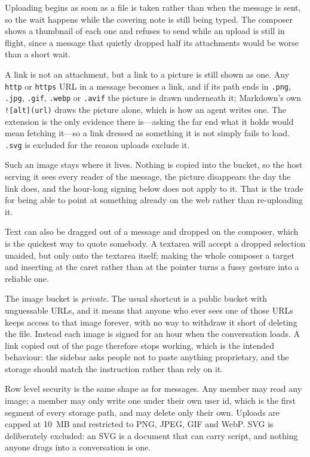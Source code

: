 \documentclass[11pt,letterpaper]{article}
\begin{document}
Uploading begins as soon as a file is taken rather than when the message is
sent, so the wait happens while the covering note is still being typed. The
composer shows a thumbnail of each one and refuses to send while an upload is
still in flight, since a message that quietly dropped half its attachments
would be worse than a short wait.

A link is not an attachment, but a link to a picture is still shown as one.
Any \texttt{http} or \texttt{https} URL in a message becomes a link, and if
its path ends in \texttt{.png}, \texttt{.jpg}, \texttt{.gif},
\texttt{.webp} or \texttt{.avif} the picture is drawn underneath it;
Markdown's own \texttt{!{[}alt{]}(url)} draws the picture alone, which is how
an agent writes one. The extension is the only evidence there is---asking the
far end what it holds would mean fetching it---so a link dressed as something
it is not simply fails to load. \texttt{.svg} is excluded for the reason
uploads exclude it.

Such an image stays where it lives. Nothing is copied into the bucket, so the
host serving it sees every reader of the message, the picture disappears the
day the link does, and the hour-long signing below does not apply to it. That
is the trade for being able to point at something already on the web rather
than re-uploading it.

Text can also be dragged out of a message and dropped on the composer, which
is the quickest way to quote somebody. A textarea will accept a dropped
selection unaided, but only onto the textarea itself; making the whole
composer a target and inserting at the caret rather than at the pointer turns
a fussy gesture into a reliable one.

The image bucket is \emph{private}. The usual shortcut is a public bucket with
unguessable URLs, and it means that anyone who ever sees one of those URLs
keeps access to that image forever, with no way to withdraw it short of
deleting the file. Instead each image is signed for an hour when the
conversation loads. A link copied out of the page therefore stops working,
which is the intended behaviour: the sidebar asks people not to paste anything
proprietary, and the storage should match the instruction rather than rely on
it.

Row level security is the same shape as for messages. Any member may read any
image; a member may only write one under their own user id, which is the first
segment of every storage path, and may delete only their own. Uploads are
capped at 10~MB and restricted to PNG, JPEG, GIF and WebP. SVG is deliberately
excluded: an SVG is a document that can carry script, and nothing anyone drags
into a conversation is one.
\end{document}

